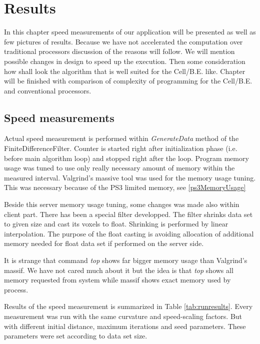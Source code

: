 \chapter{Results}

In this chapter speed measurements of our application will be presented as well as few pictures of results.
Because we have not accelerated the computation over traditional processors discussion of the reasons will follow.
We will mention possible changes in design to speed up the execution.
Then some consideration how shall look the algorithm that is well suited for the Cell/B.E. like.
Chapter will be finished with comparison of complexity of programming for the Cell/B.E. and conventional processors.

\section{Speed measurements}

\par
Actual speed measurement is performed within \emph{GenerateData} method of the FiniteDifferenceFilter.
Counter is started right after initialization phase (i.e. before main algorithm loop) and stopped right after the loop.
Program memory usage was tuned to use only really necessary amount of memory within the measured interval.
Valgrind's massive tool was used for the memory usage tuning.
This was necessary because of the PS3 limited memory, see \ref{ps3MemoryUsage}

\par
Beside this server memory usage tuning, some changes was made also within client part.
There has been a special filter developped.
The filter shrinks data set to given size and cast its voxels to float.
Shrinking is performed by linear interpolation.
The purpose of the float casting is avoiding allocation of additional memory needed for float data set if performed on the server side.

\par
It is strange that command \emph{top} shows far bigger memory usage than Valgrind's massif.
We have not cared much about it but the idea is that \emph{top} shows all memory requested from system while massif shows exact memory used by process.

\par
Results of the speed measurement is summarized in Table \ref{tab:runresults}.
Every measurement was run with the same curvature and speed-scaling factors.
But with different initial distance, maximum iterations and seed parameters.
These parameters were set according to data set size.

